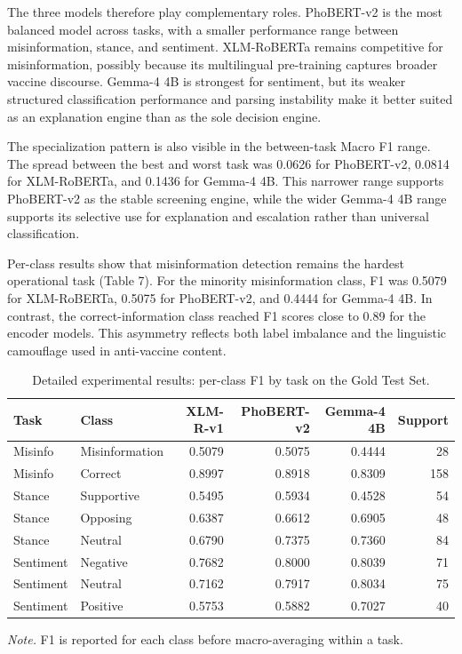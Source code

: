 \documentclass[runningheads]{llncs}
\begin{document}
The three models therefore play complementary roles. PhoBERT-v2 is the most balanced model across tasks, with a smaller performance range between misinformation, stance, and sentiment. XLM-RoBERTa remains competitive for misinformation, possibly because its multilingual pre-training captures broader vaccine discourse. Gemma-4 4B is strongest for sentiment, but its weaker structured classification performance and parsing instability make it better suited as an explanation engine than as the sole decision engine.

The specialization pattern is also visible in the between-task Macro F1 range. The spread between the best and worst task was 0.0626 for PhoBERT-v2, 0.0814 for XLM-RoBERTa, and 0.1436 for Gemma-4 4B. This narrower range supports PhoBERT-v2 as the stable screening engine, while the wider Gemma-4 4B range supports its selective use for explanation and escalation rather than universal classification.

Per-class results show that misinformation detection remains the hardest operational task (Table 7). For the minority misinformation class, F1 was 0.5079 for XLM-RoBERTa, 0.5075 for PhoBERT-v2, and 0.4444 for Gemma-4 4B. In contrast, the correct-information class reached F1 scores close to 0.89 for the encoder models. This asymmetry reflects both label imbalance and the linguistic camouflage used in anti-vaccine content.

\begin{table}[t]
\caption{Detailed experimental results: per-class F1 by task on the Gold Test Set.}\label{tab:perclass}
\centering
\small
\setlength{\tabcolsep}{4pt}
\renewcommand{\arraystretch}{1.05}
\begin{tabular}{llrrrr}
\hline
Task & Class & XLM-R-v1 & PhoBERT-v2 & Gemma-4 4B & Support\\
\hline
Misinfo & Misinformation & 0.5079 & 0.5075 & 0.4444 & 28\\
Misinfo & Correct & 0.8997 & 0.8918 & 0.8309 & 158\\
Stance & Supportive & 0.5495 & 0.5934 & 0.4528 & 54\\
Stance & Opposing & 0.6387 & 0.6612 & 0.6905 & 48\\
Stance & Neutral & 0.6790 & 0.7375 & 0.7360 & 84\\
Sentiment & Negative & 0.7682 & 0.8000 & 0.8039 & 71\\
Sentiment & Neutral & 0.7162 & 0.7917 & 0.8034 & 75\\
Sentiment & Positive & 0.5753 & 0.5882 & 0.7027 & 40\\
\hline
\end{tabular}
\vspace{2pt}
\parbox{\textwidth}{\footnotesize\emph{Note.} F1 is reported for each class before macro-averaging within a task.}
\end{table}
\end{document}
